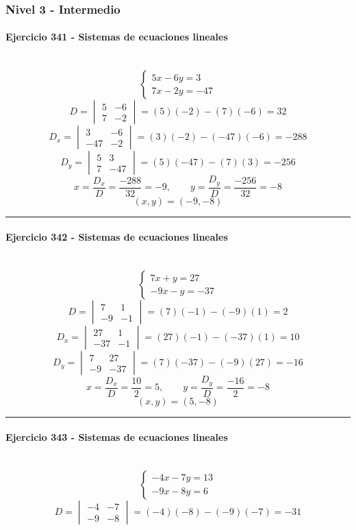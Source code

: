 \documentclass[10pt,a4paper]{article}
\newcommand{\res}[1]{\paragraph{#1}\mbox{}\\[-1.2em]}
\begin{document}
\subsubsection*{Nivel 3 - Intermedio}
\res{Ejercicio 341 - Sistemas de ecuaciones lineales}
\[ \begin{cases}5 x - 6 y=3\\7 x - 2 y=-47\end{cases} \]
\[ D=\begin{vmatrix}5&-6\\7&-2\end{vmatrix}=(5)(-2)-(7)(-6)=32 \]
\[ D_x=\begin{vmatrix}3&-6\\-47&-2\end{vmatrix}=(3)(-2)-(-47)(-6)=-288 \]
\[ D_y=\begin{vmatrix}5&3\\7&-47\end{vmatrix}=(5)(-47)-(7)(3)=-256 \]
\[ x=\frac{D_x}{D}=\frac{-288}{32}=-9,\qquad y=\frac{D_y}{D}=\frac{-256}{32}=-8 \]
\[ \boxed{(x,y)=(-9,-8)} \]
\vspace{1mm}\hrule\vspace{2mm}
\res{Ejercicio 342 - Sistemas de ecuaciones lineales}
\[ \begin{cases}7 x + y=27\\- 9 x - y=-37\end{cases} \]
\[ D=\begin{vmatrix}7&1\\-9&-1\end{vmatrix}=(7)(-1)-(-9)(1)=2 \]
\[ D_x=\begin{vmatrix}27&1\\-37&-1\end{vmatrix}=(27)(-1)-(-37)(1)=10 \]
\[ D_y=\begin{vmatrix}7&27\\-9&-37\end{vmatrix}=(7)(-37)-(-9)(27)=-16 \]
\[ x=\frac{D_x}{D}=\frac{10}{2}=5,\qquad y=\frac{D_y}{D}=\frac{-16}{2}=-8 \]
\[ \boxed{(x,y)=(5,-8)} \]
\vspace{1mm}\hrule\vspace{2mm}
\res{Ejercicio 343 - Sistemas de ecuaciones lineales}
\[ \begin{cases}- 4 x - 7 y=13\\- 9 x - 8 y=6\end{cases} \]
\[ D=\begin{vmatrix}-4&-7\\-9&-8\end{vmatrix}=(-4)(-8)-(-9)(-7)=-31 \]
\end{document}
